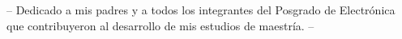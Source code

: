 
\thispagestyle{empty}

\vspace*{3cm}


\begin{center}
-- Dedicado a mis padres y a todos los integrantes del Posgrado de Electrónica \\ \medskip
que contribuyeron al desarrollo de mis estudios de maestría. --
\end{center}


